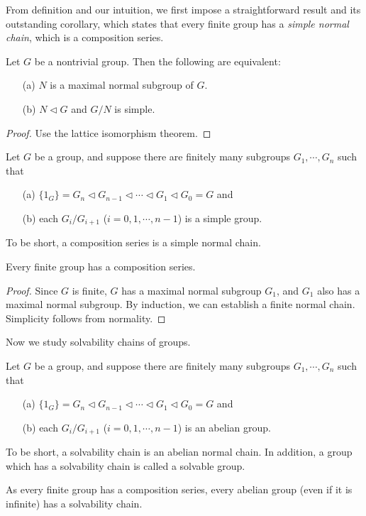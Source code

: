 From definition and our intuition, we first impose a straightforward result and its outstanding corollary, which states that every finite group has a \textit{simple normal chain}, which is a composition series.
\begin{prop}
    Let $G$ be a nontrivial group.
    Then the following are equivalent:
    \begin{enumerate}
        \item[(a)]
        {
            $N$ is a maximal normal subgroup of $G$.
        }
        \item[(b)]
        {
            $N\triangleleft G$ and $G/N$ is simple.
        }
    \end{enumerate}
\end{prop}
\begin{proof}
    Use the lattice isomorphism theorem.
\end{proof}
\begin{defi}
    Let $G$ be a group, and suppose there are finitely many subgroups $G_1, \cdots, G_n$ such that
    \begin{enumerate}
        \item[(a)]
        {
            $\{1_G\}=G_n\triangleleft G_{n-1}\triangleleft \cdots \triangleleft G_1 \triangleleft G_0=G$ and
        }
        \item[(b)]
        {
            each $G_i/G_{i+1}$ ($i=0, 1, \cdots, n-1$) is a simple group.
        }
    \end{enumerate}
    To be short, a composition series is a simple normal chain.
\end{defi}
\begin{cor}
    Every finite group has a composition series.
\end{cor}
\begin{proof}
    Since $G$ is finite, $G$ has a maximal normal subgroup $G_1$, and $G_1$ also has a maximal normal subgroup.
    By induction, we can establish a finite normal chain.
    Simplicity follows from normality.
\end{proof}

Now we study solvability chains of groups.
\begin{defi}
    Let $G$ be a group, and suppose there are finitely many subgroups $G_1, \cdots, G_n$ such that
    \begin{enumerate}
        \item[(a)]
        {
            $\{1_G\}=G_n\triangleleft G_{n-1}\triangleleft \cdots \triangleleft G_1 \triangleleft G_0=G$ and
        }
        \item[(b)]
        {
            each $G_i/G_{i+1}$ ($i=0, 1, \cdots, n-1$) is an abelian group.
        }
    \end{enumerate}
    To be short, a solvability chain is an abelian normal chain.
    In addition, a group which has a solvability chain is called a solvable group.
\end{defi}
As every finite group has a composition series, every abelian group (even if it is infinite) has a solvability chain.

